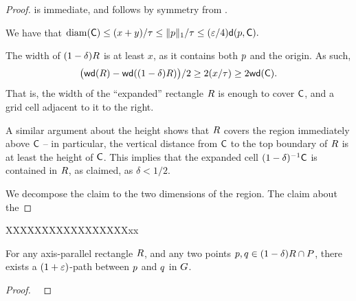 \documentclass[12pt]{article}%
\begin{document}
\begin{proof}
     is immediate, and  follows by
    symmetry from .

    \smallskip%
    \noindent%
     We have that
    \begin{math}
        \diameterX{\cell}%
        \leq%
        (x+y) /\gConst%
        \leq%
        \|\pa\|_1 /\gConst \leq %
        (\eps/4) \dsY{\pa}{\cell}.
    \end{math}

    \newcommand{\widthX}[1]{\Mh{\mathsf{wd}}\pth{#1}} \smallskip%
    \smallskip%
    \noindent%
     The width of $(1-\delta)R$ is at least $x$,
    as it contains both $p$ and the origin. As such,
    \begin{equation*}
        \bigl( \widthX{\rect} - \widthX{(1-\delta)\rect} \bigr)/2 \geq
        2(x /\tau) \geq 2 \widthX{\cell}.
    \end{equation*}
    That is, the width of the ``expanded'' rectangle $R$ is enough
    to cover $\mathsf{C}$, and a grid cell adjacent to it to the right.

    A similar argument about the height shows that $R$ covers the
    region immediately above $\mathsf{C}$ -- in particular, the vertical
    distance from $\mathsf{C}$ to the top boundary of $R$ is at least
    the height of $\mathsf{C}$. This implies that the expanded cell
    $(1-\delta)^{-1}\mathsf{C}$ is contained in $R$, as claimed, as
    $\delta < 1/2$.


    \smallskip%
    \noindent%
     We decompose the claim to the two dimensions of the
    region. The claim about the 
\end{proof}

XXXXXXXXXXXXXXXXXxx

\begin{lemma}
    For any axis-parallel rectangle $R$, and any two points
    $p, q \in (1-\delta)R \cap P$, there exists a
    $(1+\varepsilon)$-path between $p$ and $q$ in $G$.
\end{lemma}
\begin{proof}
    ~
\end{proof}



\end{document}
